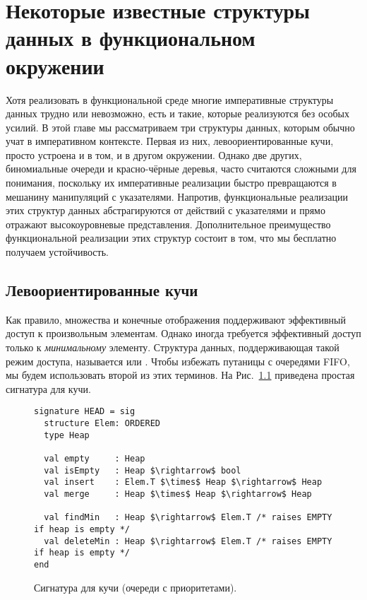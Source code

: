 \chapter{Некоторые известные структуры данных в функциональном
  окружении}
\label{ch:3}

Хотя реализовать в функциональной среде многие императивные структуры
данных трудно или невозможно, есть и такие, которые реализуются без
особых усилий.  В этой главе мы рассматриваем три структуры данных,
которым обычно учат в императивном контексте. Первая из них,
левоориентированные кучи, просто устроена и в том, и в другом
окружении. Однако две других, биномиальные очереди и красно-чёрные
деревья, часто считаются сложными для понимания, поскольку
их императивные реализации быстро превращаются в мешанину манипуляций
с указателями.  Напротив, функциональные реализации этих структур
данных абстрагируются от действий с указателями и прямо отражают
высокоуровневые представления. Дополнительное преимущество
функциональной реализации этих структур состоит в том, что мы
бесплатно получаем устойчивость.

\section{Левоориентированные кучи}
\label{sc:3.1}

Как правило, множества и конечные отображения поддерживают эффективный
доступ к произвольным элементам. Однако иногда требуется эффективный
доступ только к \emph{минимальному} элементу.  Структура данных,
поддерживающая такой режим доступа, называется  или .  Чтобы избежать
путаницы с очередями FIFO, мы будем использовать второй из этих
терминов. На Рис.~\ref{fig:3.1} приведена простая сигнатура для кучи.

\begin{figure}
\begin{lstlisting}
signature HEAD = sig
  structure Elem: ORDERED
  type Heap

  val empty     : Heap
  val isEmpty   : Heap $\rightarrow$ bool
  val insert    : Elem.T $\times$ Heap $\rightarrow$ Heap
  val merge     : Heap $\times$ Heap $\rightarrow$ Heap

  val findMin   : Heap $\rightarrow$ Elem.T /* raises EMPTY if heap is empty */
  val deleteMin : Heap $\rightarrow$ Elem.T /* raises EMPTY if heap is empty */
end
\end{lstlisting}
\caption{Сигнатура для кучи (очереди с приоритетами).} \label{fig:3.1}
\end{figure}

